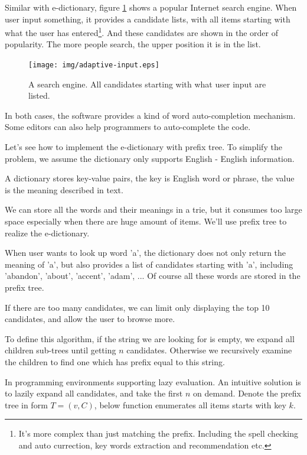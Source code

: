 \documentclass[b5paper]{article}
\begin{document}
Similar with e-dictionary, figure \ref{fig:word-completion} shows a popular
Internet search engine. When user input something, it provides a candidate
lists, with all items starting with what the user has entered\footnote{It's more complex than just matching the prefix. Including the spell checking and auto currection, key words extraction and recommendation etc.}. And these candidates
are shown in the order of popularity. The more people search, the
upper position it is in the list.

\begin{figure}[htbp]
  \centering
  \texttt{[image: img/adaptive-input.eps]}
  \caption{A search engine. All candidates starting with what user input are listed.}
  \label{fig:word-completion}
\end{figure}

In both cases, the software provides a kind of word auto-completion mechanism.
Some editors can also help programmers to auto-complete the code.

Let's see how to implement the e-dictionary with prefix tree.
To simplify the problem, we assume the dictionary only supports English - English
information.

A dictionary stores key-value pairs, the key is English
word or phrase, the value is the meaning described in text.

We can store all the words and their meanings in a trie, but it consumes
too large space especially when there are huge amount of items. We'll use
prefix tree to realize the e-dictionary.

When user wants to look up word 'a', the dictionary does not only
return the meaning of 'a', but also provides a list of
candidates starting with 'a', including 'abandon', 'about',
'accent', 'adam', ... Of course all these words are stored in the prefix tree.

If there are too many candidates, we can limit only displaying the top 10
candidates, and allow the user to browse more.

To define this algorithm, if the string we
are looking for is empty, we expand all children sub-trees until getting $n$
candidates. Otherwise we recursively examine the children to
find one which has prefix equal to this string.

In programming environments supporting lazy evaluation. An intuitive
solution is to lazily expand all candidates, and take the first $n$ on
demand. Denote the prefix tree in form $T = (v, C)$,
below function enumerates all items starts with key $k$.
\end{document}
